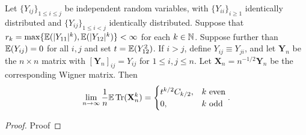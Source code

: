 \begin{proposition}
  \label{prop:matrix_moments_convergence}
  \notready
  Let $\{Y_{ij}\}_{1\le i\le j}$ be independent random variables, with $\{Y_{ii}\}_{i\ge 1}$ identically distributed and $\{Y_{ij}\}_{1\le i<j}$ identically distributed.  Suppose that $r_k = \max\{{\mathbb{E}}(|Y_{11}|^k),{\mathbb{E}}(|Y_{12}|^k)\} <\infty$ for each $k\in{\mathbb{N}}$.  Suppose further than ${\mathbb{E}}(Y_{ij})=0$ for all $i,j$ and set $t={\mathbb{E}}(Y_{12}^2)$.  If $i>j$, define $Y_{ij} \equiv Y_{ji}$, and let $\mathbf{Y}_n$ be the $n\times n$ matrix with $[\mathbf{Y}_n]_{ij} = Y_{ij}$ for $1\le i,j\le n$.  Let $\mathbf{X}_n = n^{-1/2}\mathbf{Y}_n$ be the corresponding Wigner matrix.  Then
\[
\lim_{n\to\infty} \frac{1}{n}{\mathbb{E}}\operatorname{Tr}(\mathbf{X}_n^k) = \begin{cases}
  t^{k/2}C_{k/2}, & k\text{ even} \\
  0, & k\text{ odd}
\end{cases}.
\]
\end{proposition}

\begin{proof}
\notready
Proof
\end{proof}






















